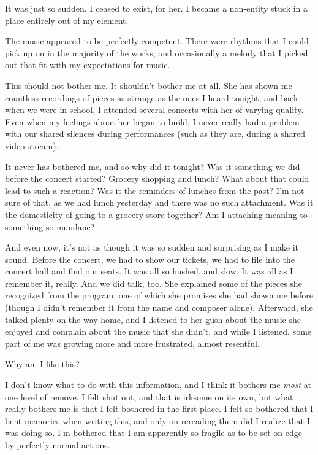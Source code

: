 It was just so sudden. I ceased to exist, for her. I became a non-entity stuck in a place entirely out of my element.

The music appeared to be perfectly competent. There were rhythms that I could pick up on in the majority of the works, and occasionally a melody that I picked out that fit with my expectations for music.

This should not bother me. It shouldn't bother me at all. She has shown me countless recordings of pieces as strange as the ones I heard tonight, and back when we were in school, I attended several concerts with her of varying quality. Even when my feelings about her began to build, I never really had a problem with our shared silences during performances (such as they are, during a shared video stream).

It never has bothered me, and so why did it tonight? Was it something we did before the concert started? Grocery shopping and lunch? What about that could lead to such a reaction? Was it the reminders of lunches from the past? I'm not sure of that, as we had lunch yesterday and there was no such attachment. Was it the domesticity of going to a grocery store together? Am I attaching meaning to something so mundane?

And even now, it's not as though it was so sudden and surprising as I make it sound. Before the concert, we had to show our tickets, we had to file into the concert hall and find our seats. It was all so hushed, and slow. It was all as I remember it, really. And we did talk, too. She explained some of the pieces she recognized from the program, one of which she promises she had shown me before (though I didn't remember it from the name and composer alone). Afterward, she talked plenty on the way home, and I listened to her gush about the music she enjoyed and complain about the music that she didn't, and while I listened, some part of me was growing more and more frustrated, almost resentful.

Why am I like this?

I don't know what to do with this information, and I think it bothers me \emph{most} at one level of remove. I felt shut out, and that is irksome on its own, but what really bothers me is that I felt bothered in the first place. I felt so bothered that I bent memories when writing this, and only on rereading them did I realize that I was doing so. I'm bothered that I am apparently so fragile as to be set on edge by perfectly normal actions.

